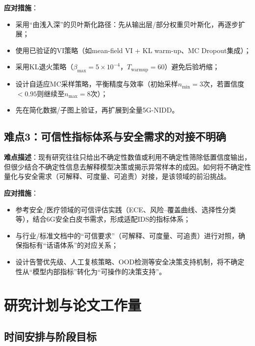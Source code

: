 \textbf{应对措施}：

\begin{itemize}
  \item 采用``由浅入深''的贝叶斯化路径：先从输出层/部分权重贝叶斯化，再逐步扩展；
  \item 使用已验证的VI策略（如mean-field VI + KL warm-up、MC Dropout集成）；
  \item 采用KL退火策略（$\beta_{\max}=5\times10^{-4}$，$T_{\text{warmup}}=60$）避免后验坍缩；
  \item 设计自适应MC采样策略，平衡精度与效率（初始采样$n_{\min}=3$次，若置信度$<0.95$则继续至$n_{\max}=8$次）；
  \item 先在简化数据/子图上验证，再扩展到全量5G-NIDD。
\end{itemize}

\subsection{难点3：可信性指标体系与安全需求的对接不明确}

\textbf{难点描述}：现有研究往往只给出不确定性数值或利用不确定性筛除低置信度输出，但很少结合不确定性信息去解释模型决策或揭示异常样本的成因。如何将不确定性量化与安全需求（可解释、可度量、可追责）对接，是该领域的前沿挑战。

\textbf{应对措施}：

\begin{itemize}
  \item 参考安全/医疗领域的可信评估实践（ECE、风险–覆盖曲线、选择性分类等），结合6G安全白皮书需求，形成适配IDS的指标体系；
  \item 与行业/标准文档中的``可信要求''（可解释、可度量、可追责）进行对照，确保指标有``话语体系''的对应关系；
  \item 设计告警优先级、人工复核策略、OOD检测等安全决策支持机制，将不确定性从``模型内部指标''转化为``可操作的决策支持''。
\end{itemize}



\section{研究计划与论文工作量}

\subsection{时间安排与阶段目标}

